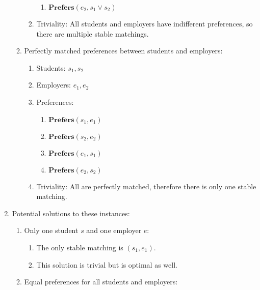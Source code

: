 \documentclass[12pt]{article}
\begin{document}
\begin{enumerate}
\begin{enumerate}
\begin{enumerate}
\begin{enumerate}
                            \item $\textbf{Prefers}(e_2, s_1 \lor s_2)$
                        \end{enumerate}
                    \item Triviality: All students and employers have indifferent preferences, 
                    so there are multiple stable matchings.
                \end{enumerate}
                \item Perfectly matched preferences between students and employers:
                \begin{enumerate}
                    \item Students: ${s_1, s_2}$
                    \item Employers: ${e_1, e_2}$
                    \item Preferences:
                        \begin{enumerate}
                            \item $\textbf{Prefers}(s_1, e_1)$
                            \item $\textbf{Prefers}(s_2, e_2)$
                            \item $\textbf{Prefers}(e_1, s_1)$
                            \item $\textbf{Prefers}(e_2, s_2)$
                        \end{enumerate}
                    \item Triviality: All are perfectly matched, therefore there is only one stable matching.
                \end{enumerate}
                \end{enumerate}
        \item Potential solutions to these instances:
            \begin{enumerate}
                \item Only one student $s$ and one employer $e$:
                \begin{enumerate}[-]
                    \item The only stable matching is $(s_1, e_1)$.
                    \item This solution is trivial but is optimal as well.
                \end{enumerate}
                \item Equal preferences for all students and employers:
                \begin{enumerate}[-]

\end{enumerate}
\end{enumerate}
\end{enumerate}
\end{document}
